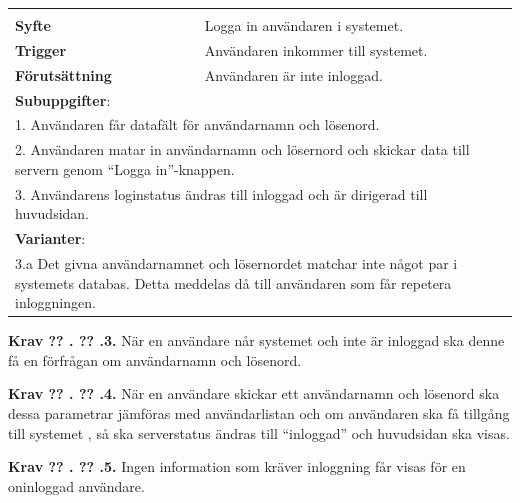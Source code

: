 \documentclass[a4paper]{article}
\newcommand\getcurrentref[1]{%
 \ifnumequal{\value{#1}}{0}
  {??}
  {\the\value{#1}}%
}
\newcommand\requirement[2]{
	\numberedrow{Krav}{#1}{#2}
}
\newcommand\scenario[2] {
	\numberedrow{Scenario}{#1}{#2}
}
\newcommand\numberedrow[3]{
	\noindent
	\textbf{#1 \getcurrentref{section}.\getcurrentref{subsection}.#2.} #3
	
}
\begin{document}
\begin{table}[H]
\begin{tabular}{ | p{2cm} p{11cm} | }
   
        \hline
	\multicolumn{2}{|p{13cm}|}{ \indent\scenario{1}} \\
    \textbf{Syfte} & Logga in användaren i systemet.\\
    \textbf{Trigger} & Användaren inkommer till systemet. \\
    \textbf{Förutsättning} & Användaren är inte inloggad.\\
    \hline

	\multicolumn{2}{|p{13cm}|}{ \textbf{Subuppgifter}:} \\

	\multicolumn{2}{|p{13cm}|}{ 1. Användaren får datafält för användarnamn och lösenord.}\\
	\multicolumn{2}{|p{13cm}|}{ 2. Användaren matar in användarnamn och lösernord och skickar data till servern genom ``Logga in''-knappen.} \\	
	\multicolumn{2}{|p{13cm}|}{ 3. Användarens loginstatus ändras till inloggad och är dirigerad till huvudsidan. }\\ \hline
    \multicolumn{2}{|p{13cm}|}{ \textbf{Varianter}: }\\
	\multicolumn{2}{|p{13cm}|}{ 3.a Det givna användarnamnet och lösernordet matchar inte något par i systemets databas. Detta meddelas då till användaren som får repetera inloggningen.}\\
	    \hline


\end{tabular}
\end{table}

\requirement{3}{När en användare når systemet och inte är inloggad ska denne få en förfrågan om användarnamn och lösenord.}
\requirement{4}{När en användare skickar ett användarnamn och lösenord ska dessa parametrar jämföras med användarlistan och om användaren ska få tillgång till systemet , så ska serverstatus ändras till ``inloggad'' och huvudsidan ska visas.}
\requirement{5}{Ingen information som kräver inloggning får visas för en oninloggad användare.}
\end{document}
